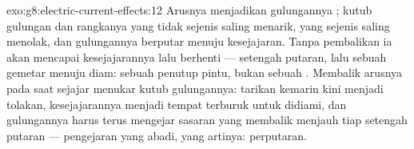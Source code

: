 \begin{solution}{exo:g8:electric-current-effects:12}
Arusnya menjadikan gulungannya ; kutub gulungan dan rangkanya
yang tidak sejenis saling menarik, yang sejenis saling menolak, dan
gulungannya berputar menuju kesejajaran. Tanpa pembalikan ia akan
mencapai kesejajarannya lalu berhenti --- setengah putaran, lalu
sebuah gemetar menuju diam: sebuah penutup pintu, bukan sebuah .
Membalik arusnya pada saat sejajar menukar kutub gulungannya: tarikan
kemarin kini menjadi tolakan, kesejajarannya menjadi tempat terburuk
untuk didiami, dan gulungannya harus terus mengejar sasaran yang
membalik menjauh tiap setengah putaran --- pengejaran yang abadi,
yang artinya: perputaran.
\end{solution}

